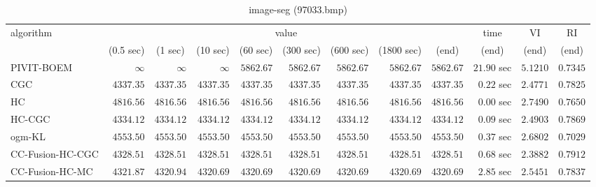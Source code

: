 \begin{table}[H]
\scriptsize
\centering
\caption{image-seg (97033.bmp)}
\label{tab:anytimetable-image-seg-97033.bmp}
\begin{tabular}{lrrrrrrrrrrr}
\toprule
           algorithm &                                   \multicolumn{8}{c}{value} & \multicolumn{1}{c}{time}    & \multicolumn{1}{c}{VI}  & \multicolumn{1}{c}{RI} \\  
\cmidrule(lr){2-9}\cmidrule(lr){10-10} \cmidrule(lr){11-11} \cmidrule(lr){12-12}   
                     & \multicolumn{1}{c}{(0.5 sec)} & \multicolumn{1}{c}{(1 sec)} & \multicolumn{1}{c}{(10 sec)} & \multicolumn{1}{c}{(60 sec)} & \multicolumn{1}{c}{(300 sec)} & \multicolumn{1}{c}{(600 sec)} & \multicolumn{1}{c}{(1800 sec)} & \multicolumn{1}{c}{(end)} & \multicolumn{1}{c}{(end)}    & \multicolumn{1}{c}{(end)}   & \multicolumn{1}{c}{(end)}  \\ \midrule 
          PIVIT-BOEM & $\infty$ & $\infty$ & $\infty$ & $      5862.67$ & $      5862.67$ & $      5862.67$ & $      5862.67$ & $      5862.67$ & $        21.90$ sec    & $       5.1210$  & $       0.7345$ \\ 
                 CGC & $      4337.35$ & $      4337.35$ & $      4337.35$ & $      4337.35$ & $      4337.35$ & $      4337.35$ & $      4337.35$ & $      4337.35$ & $         0.22$ sec    & $       2.4771$  & $       0.7825$ \\ 
                  HC & $      4816.56$ & $      4816.56$ & $      4816.56$ & $      4816.56$ & $      4816.56$ & $      4816.56$ & $      4816.56$ & $      4816.56$ & $         0.00$ sec    & $       2.7490$  & $       0.7650$ \\ 
              HC-CGC & $      4334.12$ & $      4334.12$ & $      4334.12$ & $      4334.12$ & $      4334.12$ & $      4334.12$ & $      4334.12$ & $      4334.12$ & $         0.09$ sec    & $       2.4903$  & $       0.7869$ \\ 
              ogm-KL & $      4553.50$ & $      4553.50$ & $      4553.50$ & $      4553.50$ & $      4553.50$ & $      4553.50$ & $      4553.50$ & $      4553.50$ & $         0.37$ sec    & $       2.6802$  & $       0.7029$ \\ 
    CC-Fusion-HC-CGC & $      4328.51$ & $      4328.51$ & $      4328.51$ & $      4328.51$ & $      4328.51$ & $      4328.51$ & $      4328.51$ & $      4328.51$ & $         0.68$ sec    & $       2.3882$  & $       0.7912$ \\ 
     CC-Fusion-HC-MC & $      4321.87$ & $      4320.94$ & $      4320.69$ & $      4320.69$ & $      4320.69$ & $      4320.69$ & $      4320.69$ & $      4320.69$ & $         2.85$ sec    & $       2.5451$  & $       0.7837$ \\ 

\end{tabular}
\end{table}
